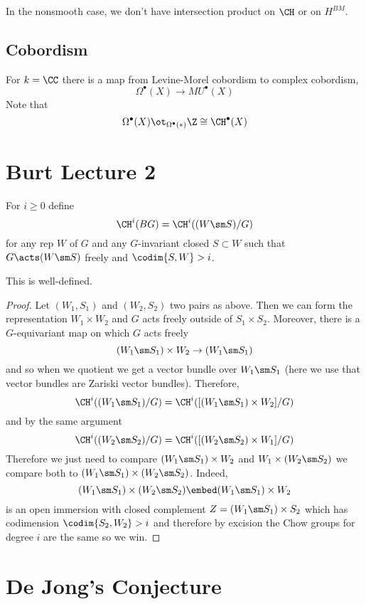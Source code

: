 \documentclass{article}
\begin{document}
In the nonsmooth case, we don't have intersection product on $\CH$ or on $H^{BM}$. 

\subsection{Cobordism}

For $k = \CC$ there is a map from Levine-Morel cobordism to complex cobordism,
\[ \Omega^\bullet(X) \to MU^\bullet(X) \]
Note that
\[ \Omega^\bullet(X) \ot_{\Omega^\bullet(*)} \Z \cong \CH^\bullet(X) \]

\section{Burt Lecture 2}

For $i \ge 0$ define
\[ \CH^i(BG) = \CH^i((W \sm S)/G) \]
for any rep $W$ of $G$ and any $G$-invariant closed $S \subset W$ such that $G \acts (W \sm S)$ freely and $\codim{S, W} > i$.

\begin{lemma}
This is well-defined.
\end{lemma}

\begin{proof}
Let $(W_1, S_1)$ and $(W_2, S_2)$ two pairs as above. Then we can form the representation $W_1 \times W_2$ and $G$ acts freely outside of $S_1 \times S_2$. Moreover, there is a $G$-equivariant map on which $G$ acts freely
\[ (W_1 \sm S_1) \times W_2 \to (W_1 \sm S_1) \]
and so when we quotient we get a vector bundle over $W_1 \sm S_1$ (here we use that \etale vector bundles are Zariski vector bundles). Therefore,
\[ \CH^i((W_1 \sm S_1)/G) = \CH^i([(W_1 \sm S_1) \times W_2] / G) \]
and by the same argument
\[ \CH^i((W_2 \sm S_2)/G) = \CH^i([(W_2 \sm S_2) \times W_1] / G) \]
Therefore we just need to compare $(W_1 \sm S_1) \times W_2$ and $W_1 \times (W_2 \sm S_2)$ we compare both to $(W_1 \sm S_1) \times (W_2 \sm S_2)$. Indeed, 
\[ (W_1 \sm S_1) \times (W_2 \sm S_2) \embed (W_1 \sm S_1) \times W_2 \]
is an open immersion with closed complement $Z = (W_1 \sm S_1) \times S_2$ which has codimension $\codim{S_2, W_2} > i$ and therefore by excision the Chow groups for degree $i$ are the same so we win. 
\end{proof}


\section{De Jong's Conjecture}
\end{document}
